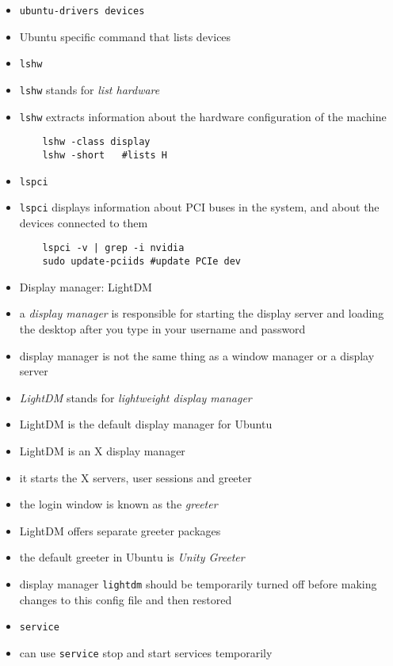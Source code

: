 \documentclass[twocolumn]{IEEEtran} %
\begin{document}
\begin{itemize}
    \item \verb|ubuntu-drivers devices|
    \bi
        \item Ubuntu specific command that lists devices
    \ei
    \item \verb|lshw|
    \bi
        \item \verb|lshw| stands for \emph{list hardware}
        \item \verb|lshw| extracts information about the hardware configuration of the machine
    \ei
        \begin{verbatim}
    lshw -class display
    lshw -short   #lists H
        \end{verbatim}
    \item \verb|lspci|
    \bi
        \item \verb|lspci| displays information about PCI buses in the system, and about the devices connected to them
    \ei
    \begin{verbatim}
    lspci -v | grep -i nvidia
    sudo update-pciids #update PCIe dev
    \end{verbatim}
    \item Display manager: LightDM
    \bi
        \item a \emph{display manager} is responsible for starting the display server and loading the desktop after you type in your username and password
        \bi
            \item display manager is not the same thing as a window manager or a display server
        \ei
        \item \emph{LightDM} stands for \emph{lightweight display manager}
        \item LightDM is the default display manager for Ubuntu
        \bi
            \item LightDM is an X display manager
            \item it starts the X servers, user sessions and greeter
        \ei
        \item the login window is known as the \emph{greeter}
        \bi
            \item LightDM offers separate greeter packages
            \item the default greeter in Ubuntu is \emph{Unity Greeter}
        \ei
        \item display manager \verb|lightdm| should be temporarily turned off before making changes to this config file and then restored
    \ei
    \item \verb|service|
    \bi
        \item can use \verb|service| stop and start services temporarily

\end{itemize}
\end{document}

